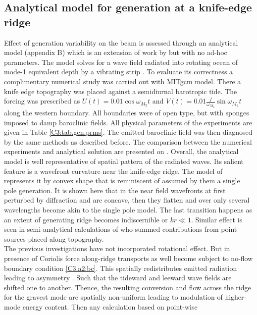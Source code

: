 \documentclass[12pt]{article}
\begin{document}
\subsection{Analytical model for generation at a knife-edge ridge}
Effect of generation variability on the beam is assessed through an analytical model (appendix B) 
which is an extension of work by \citep{rainville2010interference} but with no ad-hoc parameters. 
The model solves for a wave field radiated into rotating ocean of mode-1 equivalent depth by a 
vibrating strip \citep{morse1946methods}. To evaluate its correctness a complimentary numerical 
study was carried out with MITgcm model. There a knife edge topography was placed against a 
semidiurnal barotropic tide. The forcing was prescribed as $U(t) = 0.01 \cos 
\omega_{M_2} t$ and $V(t) = 0.01 \frac{f}{\omega_{M_2}} \sin \omega_{M_2} t$ along the western  
boundary. All boundaries were of open type, but with sponges imposed to damp baroclinic fields. 
All physical parameters of the experiments are given in Table \ref{C3:tab.gen.prms}. The emitted 
baroclinic field was then diagnosed by the same methods as described before. The comparison between 
the numerical experiments and analytical solution are presented on . 
Overall, the analytical model is well representative of spatial pattern of the radiated waves. Its 
salient feature is a wavefront curvature near the knife-edge ridge. The model of 
\citep{rainville2010interference} represents it by convex shape that is reminiscent of 
assumed by them a single pole generation. It is shown here that in the near field wavefronts at 
first perturbed by diffraction and are concave, then they flatten and over only several wavelengths 
become akin to the single pole model. The last transition happens as an extent of generating ridge 
becomes indiscernible or $kr \ll 1$. Similar effect is seen in semi-analytical calculations of 
\citep{zhang2014modeling} who summed contributions from point sources placed along topography.\\
The previous investigations have not incorporated rotational effect. But in presence of Coriolis 
force along-ridge transports as well become subject to no-flow boundary condition \eqref{C3.a2:bc}. 
This spatially redistributes emitted radiation leading to asymmetry . Such that the tideward and leeward wave fields are shifted one to another. Thence, the 
resulting conversion and flow across the ridge for the gravest mode are spatially non-uniform 
leading to modulation of higher-mode energy content. Then any calculation based on point-wise 
\end{document}
